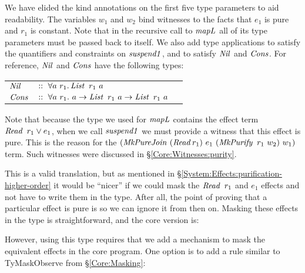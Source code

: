\bigskip
We have elided the kind annotations on the first five type parameters to aid readability. The variables $w_1$ and $w_2$ bind witnesses to the facts that $e_1$ is pure and $r_1$ is constant. Note that in the recursive call to $\operatorname{\mathit{mapL}}$ all of its type parameters must be passed back to itself. We also add type applications to satisfy the quantifiers and constraints on $\operatorname{\mathit{suspend1}}$, and to satisfy $\operatorname{\mathit{Nil}}$ and $\operatorname{\mathit{Cons}}$. For reference, $\operatorname{\mathit{Nil}}$ and $\operatorname{\mathit{Cons}}$ have the following types:

\ic
\begin{tabular}{lll}
	$\operatorname{\mathit{Nil}}$		& $:: \ \forall a \ r_1. \operatorname{\mathit{List}} \ r_1 \ a$ \\
	$\operatorname{\mathit{Cons}}$ 	& $:: \ \forall a \ r_1. \ a \to \operatorname{\mathit{List}} \ r_1 \ a \to \operatorname{\mathit{List}} \ r_1 \ a$
\end{tabular}
\medskip

Note that because the type we used for $\operatorname{\mathit{mapL}}$ contains the effect term $\operatorname{\mathit{Read}} \ r_1 \lor e_1$, when we call $\operatorname{\mathit{suspend1}}$ we must provide a witness that this effect is pure. This is the reason for the $(\iMkPureJoin \ (\iRead r_1) \ e_1 \ (\iMkPurify \ r_1 \ w_2) \ w_1)$ term. Such witnesses were discussed in \S\ref{Core:Witnesses:purity}.

This is a valid translation, but as mentioned in \S\ref{System:Effects:purification-higher-order} it would be ``nicer'' if we could mask the $\operatorname{\mathit{Read}} \ r_1$ and $e_1$ effects and not have to write them in the type. After all, the point of proving that a particular effect is pure is so we can ignore it from then on. Masking these effects in the type is straightforward, and the core version is:

\bigskip
{}

However, using this type requires that we add a mechanism to mask the equivalent effects in the core program. One option is to add a rule similar to TyMaskObserve from \S\ref{Core:Masking}:


